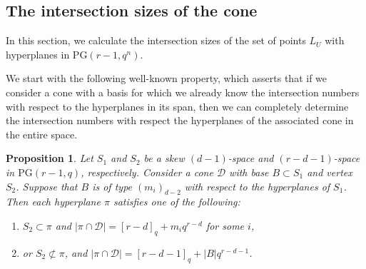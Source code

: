 \documentclass[11pt]{amsart}
\newtheorem{proposition}[theorem]{Proposition}
\newcommand{\PG}{\mathrm{PG}}
\begin{document}
\subsection{The intersection sizes of the cone}\label{sec:intersect} 


In this section, we calculate the intersection sizes of the set of points $L_U$ with hyperplanes in $\PG(r-1,q^n)$. 

We start with the following well-known property, which asserts that if we consider a cone with a basis for which we already know the intersection numbers with respect to the hyperplanes in its span, then we can completely determine the intersection numbers with respect the hyperplanes of the associated cone in the entire space.


\begin{proposition} \label{prop:intersectionconehyper}
Let $S_1$ and $S_2$ be a skew $(d-1)$-space and $(r-d-1)$-space in $\PG(r-1,q)$, respectively.
Consider a cone $\mathcal{D}$ with base $B \subset S_1$ and vertex $S_2$.
Suppose that $B$ is of type $(m_i)_{d-2}$ with respect to the hyperplanes of $S_1$. Then each hyperplane $\pi$ satisfies one of the following:
\begin{enumerate}
    \item $S_2 \subset \pi$ and \( |\pi \cap \mathcal{D}| = [r-d]_{q} + m_i q^{r-d} \) for some $i$,
    \item or $S_2 \not \subset \pi$, and \( |\pi \cap \mathcal{D}| =[r-d-1]_{q}+ |B| q^{r-d-1} \).
\end{enumerate}
\end{proposition}

\end{document}
